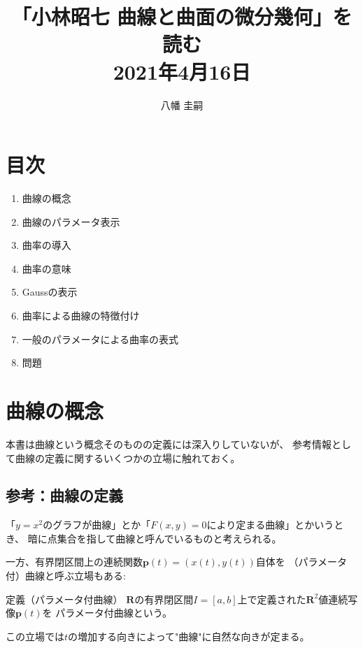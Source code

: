 \documentclass[a4j,disablejfam,dvipdfmx,papersize,slide,uplatex,21pt]{jsarticle}
\begin{document}
\title{「小林昭七 曲線と曲面の微分幾何」を読む\\
2021年4月16日}
\author{八幡 圭嗣}
\date{}
\maketitle

\section*{目次}
\begin{enumerate}
    \item 曲線の概念
    \item 曲線のパラメータ表示
    \item 曲率の導入
    \item 曲率の意味
    \item Gaussの表示
    \item 曲率による曲線の特徴付け
    \item 一般のパラメータによる曲率の表式
    \item 問題
\end{enumerate}



\section{曲線の概念}
本書は曲線という概念そのものの定義には深入りしていないが、
参考情報として曲線の定義に関するいくつかの立場に触れておく。

\newpage
\subsection*{参考：曲線の定義}
「$y=x^2$のグラフが曲線」とか「$F(x,y)=0$により定まる曲線」とかいうとき、
暗に点集合を指して曲線と呼んでいるものと考えられる。

一方、有界閉区間上の連続関数$\bm{p}(t) = (x(t), y(t))$自体を
（パラメータ付）曲線と呼ぶ立場もある\cite{kaiseki1}:

\begin{itembox}[l]{定義（パラメータ付曲線）\footnotemark[1]}
    $\bm{R}$の有界閉区間$I=[a, b]$上で定義された$\bm{R}^2$値連続写像$\bm{p}(t)$を
    パラメータ付曲線という。
\end{itembox}

この立場では$t$の増加する向きによって"曲線"に自然な向きが定まる。

\end{document}
